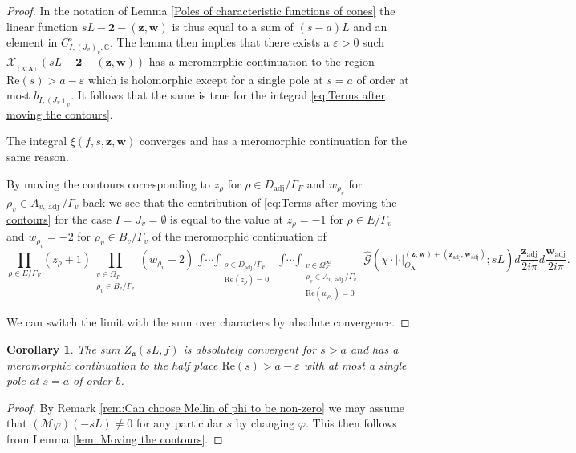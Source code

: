 \documentclass[a4paper,11pt,reqno]{amsart}
\newcommand{\C}{\mathbb{C}}
\DeclareMathOperator{\Eff}{\overline{Eff}}
\DeclareMathOperator{\adj}{adj}
\renewcommand{\Re}{\mathrm{Re}}
\newtheorem{corollary}[theorem]{Corollary}
\theoremstyle{definition}
\begin{document}
\begin{proof}
 	In the notation of Lemma \ref{Poles of characteristic functions of cones} the linear function $s L - \mathbf{2} - (\bm{z}, \bm{w})$ is thus equal to a sum of $(s - a)L$ and an element in $C_{I, (J_v)_v, \C}^{\circ}$. The lemma then implies that there exists a $\varepsilon > 0$ such $\mathcal{X}_{\Eff_{(X; \mathbf{A})}}(s L - \mathbf{2} - (\bm{z}, \bm{w}))$ has a meromorphic continuation to the region $\Re(s) > a - \varepsilon$ which is holomorphic except for a single pole at $s = a$ of order at most $b_{I, (J_v)_v}$. It follows that the same is true for the integral \eqref{eq:Terms after moving the contours}. 
 	
 	The integral $\xi(f, s, \bm{z}, \bm{w})$ converges and has a meromorphic continuation for the same reason.
 	
 	 By moving the contours corresponding to $z_{\rho}$ for $\rho \in D_{\adj}/\Gamma_F$ and $w_{\rho_v}$ for $\rho_v \in A_{v, \adj}/ \Gamma_v$ back we see that the contribution of \eqref{eq:Terms after moving the contours} for the case $I = J_v = \emptyset$ is equal to the value at $z_{\rho} = -1$ for $\rho \in E/\Gamma_v$ and $w_{\rho_v} = -2$ for $\rho_v \in B_v/ \Gamma_v$ of the meromorphic continuation of
 	\[
 	\prod_{\rho \in E / \Gamma_F} (z_{\rho} + 1) \prod_{\substack{v \in \Omega_F \\ \rho_v \in B_v/\Gamma_v}} (w_{\rho_v} + 2)\mathop{\int \cdots \int}_{\substack{\rho \in D_{\adj} / \Gamma_F \\ \Re(z_{\rho}) = 0}}\mathop{\int \cdots \int}_{\substack{v \in \Omega_F^{\infty} \\ \rho_v \in A_{v, \adj} /\Gamma_v \\ \Re(w_{\rho_v}) = 0}} 
 	\hat{\mathcal{G}}(\chi \cdot | \cdot|_{\Theta_{\mathbf{A}}}^{(\bm{z}, \bm{w}) + (\bm{z}_{\adj}, \bm{w}_{\adj})}; s L) d\frac{\bm{z}_{\adj}}{2 i \pi} d \frac{\bm{w}_{\adj}}{2 i \pi}.
 	\] 
 	
 	We can switch the limit with the sum over characters by absolute convergence.
\end{proof}
\begin{corollary}\label{cor:Meromorphic continuation of height zeta function}
	The sum $Z_{\mathfrak{a}}(s L, f)$ is absolutely convergent for $s > a$ and has a meromorphic continuation to the half place $\Re(s) > a - \varepsilon$ with at most a single pole at $s = a$ of order $b$.
\end{corollary}
\begin{proof}
	By Remark \ref{rem:Can choose Mellin of phi to be non-zero} we may assume that $(\mathcal{M} \varphi)(-s L) \neq 0$ for any particular $s$ by changing $\varphi$. This then follows from Lemma \ref{lem: Moving the contours}.
\end{proof}
\end{document}

